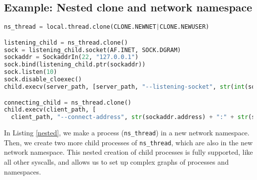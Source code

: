 \documentclass{acmart}
\begin{document}
\subsection{Example: Nested clone and network namespace}
\begin{lstlisting}[float,language=Python,label={nested},caption={Nested clone and network namespace}]
ns_thread = local.thread.clone(CLONE.NEWNET|CLONE.NEWUSER)

listening_child = ns_thread.clone()
sock = listening_child.socket(AF.INET, SOCK.DGRAM)
sockaddr = SockaddrIn(22, "127.0.0.1")
sock.bind(listening_child.ptr(sockaddr))
sock.listen(10)
sock.disable_cloexec()
child.execv(server_path, [server_path, "--listening-socket", str(int(sock))])

connecting_child = ns_thread.clone()
child.execv(client_path, [
  client_path, "--connect-address", str(sockaddr.address) + ":" + str(sockaddr.port)])
\end{lstlisting}
In Listing \ref{nested},
we make a process (\texttt{ns\_thread}) in a new network namespace.
Then, we create two more child processes of \texttt{ns\_thread},
which are also in the new network namespace.
This nested creation of child processes is fully supported,
like all other syscalls,
and allows us to set up complex graphs of processes and namespaces.
\end{document}
